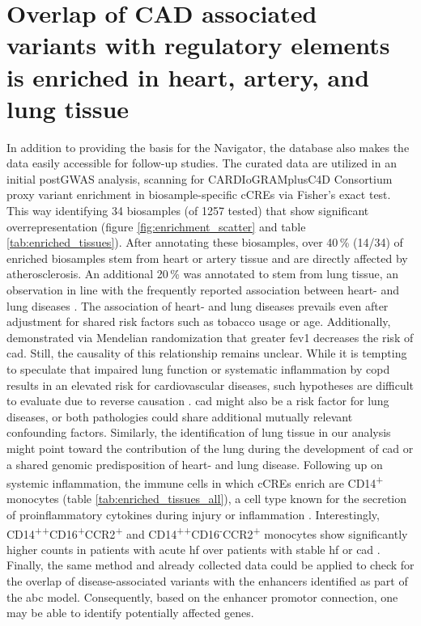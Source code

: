 \section{Overlap of CAD associated variants with regulatory elements is enriched in heart, artery, and lung tissue}
In addition to providing the basis for the  Navigator, the database also makes the data easily accessible for follow-up studies. The curated data are utilized in an initial postGWAS analysis, scanning for CARDIoGRAMplusC4D Consortium \cite{aragamDiscoverySystematicCharacterization2021} proxy variant enrichment in biosample-specific \acp{cCRE} via Fisher's exact test. This way identifying 34 biosamples (of 1257 tested) that show significant overrepresentation (figure \ref{fig:enrichment_scatter} and table \ref{tab:enriched_tissues}). After annotating these biosamples, over 40\,\% (14/34) of enriched biosamples stem from heart or artery tissue and are directly affected by atherosclerosis. An additional 20\,\% was annotated to stem from lung tissue, an observation in line with the frequently reported association between heart- and lung diseases \cite{carterAssociationCardiovascularDisease2019, hanPulmonaryDiseasesHeart2007}. The association of heart- and lung diseases prevails even after adjustment for shared risk factors such as tobacco usage or age. Additionally, \textcite{auyeungAssociationGeneticInstrumental2018} demonstrated via Mendelian randomization that greater \ac{fev1} decreases the risk of \ac{cad}. Still, the causality of this relationship remains unclear. While it is tempting to speculate that impaired lung function or systematic inflammation by \ac{copd} results in an elevated risk for cardiovascular diseases, such hypotheses are difficult to evaluate due to reverse causation \cite{nowakLungFunctionCoronary2018}. \ac{cad} might also be a risk factor for lung diseases, or both pathologies could share additional mutually relevant confounding factors. Similarly, the identification of lung tissue in our analysis might point toward the contribution of the lung during the development of \ac{cad} or a shared genomic predisposition of heart- and lung disease. Following up on systemic inflammation, the immune cells in which \acp{cCRE} enrich are CD14\textsuperscript{+} monocytes (table \ref{tab:enriched_tissues_all}), a cell type known for the secretion of proinflammatory cytokines during injury or inflammation \cite{kapellosHumanMonocyteSubsets2019}. Interestingly, CD14\textsuperscript{++}CD16\textsuperscript{+}CCR2\textsuperscript{+} and CD14\textsuperscript{++}CD16\textsuperscript{-}CCR2\textsuperscript{+} monocytes show significantly higher counts in patients with acute \ac{hf} over patients with stable \ac{hf} or \ac{cad} \cite{wrigleyCD14CD16Monocytes2013}.
\pagebreak
Finally, the same method and already collected data could be applied to check for the overlap of disease-associated variants with the enhancers identified as part of the \ac{abc} model. Consequently, based on the enhancer promotor connection, one may be able to identify potentially affected genes.
